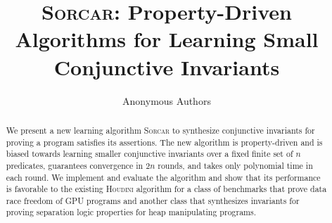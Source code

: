 \documentclass[runningheads]{llncs}
\title{\textsc{Sorcar}: Property-Driven Algorithms for Learning Small Conjunctive Invariants%
}
\author
{
    Anonymous Authors
}
\institute
{
    ~
}
\newcommand{\houdini}{\textsc{Houdini}\xspace}
\newcommand{\sorcar}{\textsc{Sorcar}\xspace}
\begin{document}
\maketitle

\begin{abstract}
We present a new learning algorithm \sorcar to synthesize conjunctive invariants for proving a program satisfies its assertions. The new algorithm is property-driven and is biased towards learning smaller conjunctive invariants over a fixed finite set of $n$ predicates, guarantees convergence in $2n$ rounds, and takes only polynomial time in each round. We implement and evaluate the algorithm and show that its performance is favorable to the existing \houdini algorithm for a class of benchmarks that prove data race freedom of GPU programs and another class that synthesizes invariants for proving separation logic properties for heap manipulating programs.
\end{abstract}




















\clearpage
\appendix

\end{document}
